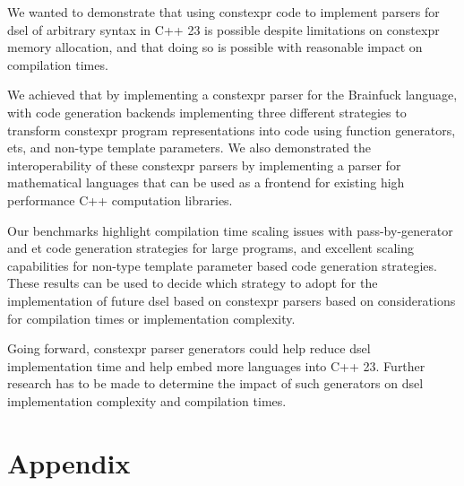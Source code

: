 \documentclass[english,12pt,a4paper]{book}
\providecommand{\cpp}{\textsc{C++}\xspace}
\begin{document}
We wanted to demonstrate that using \gls{constexpr} code to implement parsers for
\gls{dsel} of arbitrary syntax in \cpp23 is possible despite limitations on
\gls{constexpr} memory allocation, and that doing so is possible with reasonable
impact on compilation times.

We achieved that by implementing a \gls{constexpr} parser for the Brainfuck language,
with code generation backends implementing three different strategies to
transform \gls{constexpr} program representations into code using function
generators, \glspl{et}, and non-type template parameters.
We also demonstrated the interoperability of these \gls{constexpr} parsers by
implementing a parser for mathematical languages that can be used as a frontend
for existing high performance \cpp computation libraries.

Our benchmarks highlight compilation time scaling issues with pass-by-generator
and \gls{et} code generation strategies for large programs, and
excellent scaling capabilities for non-type template parameter based code
generation strategies. These results can be used to decide which strategy to
adopt for the implementation of future \gls{dsel} based on \gls{constexpr} parsers
based on considerations for compilation times or implementation complexity.

Going forward, \gls{constexpr} parser generators could help reduce
\gls{dsel} implementation time and help embed more languages into \cpp23.
Further research has to be made to determine the impact of such generators on
\gls{dsel} implementation complexity and compilation times.



\clearpage
\printglossaries

\clearpage
\printbibliography

\chapter{Appendix}

\appendix


\end{document}

